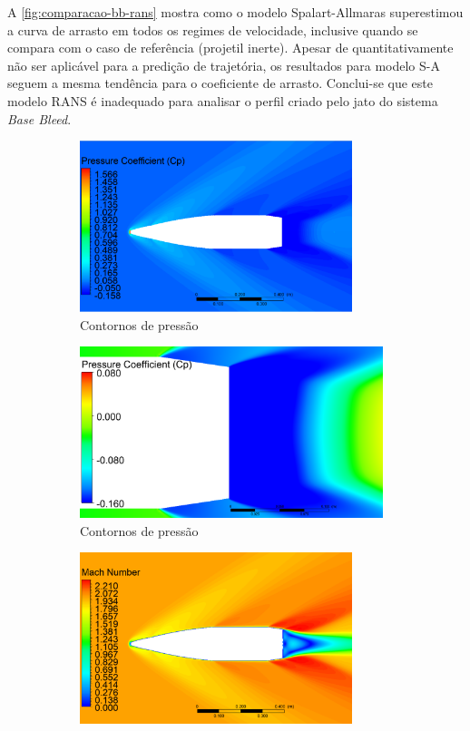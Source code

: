 A \autoref{fig:comparacao-bb-rans} mostra como o modelo Spalart-Allmaras superestimou a curva de arrasto em todos os regimes de velocidade, inclusive quando se compara com o caso de referência (projetil inerte). Apesar de quantitativamente não ser aplicável para a predição de trajetória, os resultados para modelo S-A seguem a mesma tendência para o coeficiente de arrasto. Conclui-se que este modelo RANS é inadequado para analisar o perfil criado pelo jato do sistema \textit{Base Bleed}.

\begin{figure}[!htpb]
	\centering
	\begin{subfigure}[b]{0.47\textwidth}
        \centering
        \includegraphics[height=5cm,width=\textwidth]{contorno-pressao-SPALART-2pol.png}
        \caption{Contornos de pressão}
        \label{fig:contorno-pressao-bb-2pol-RANS}
    \end{subfigure}
    \hfill
    \begin{subfigure}[b]{0.47\textwidth}
        \centering
        \includegraphics[height=5cm,width=\textwidth]{coeficientepressao-SPALART}
        \caption{Contornos de pressão}
        \label{fig:contorno-pressao-base-bb-2pol-RANS}
    \end{subfigure}
    \hfill
    \begin{subfigure}[b]{0.47\textwidth}
        \centering
        \includegraphics[height=5cm,width=\textwidth]{contorno-velocidade-SPALART-2pol.png}

\end{subfigure}
\end{figure}
